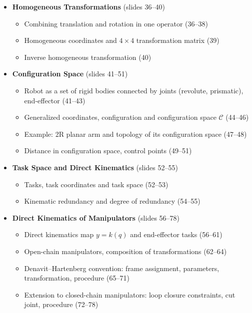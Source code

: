 \begin{itemize}
    \item \textbf{Homogeneous Transformations} (slides 36--40)
    \begin{itemize}
        \item Combining translation and rotation in one operator (36--38)
        \item Homogeneous coordinates and $4\times4$ transformation matrix (39)
        \item Inverse homogeneous transformation (40)
    \end{itemize}

    \item \textbf{Configuration Space} (slides 41--51)
    \begin{itemize}
        \item Robot as a set of rigid bodies connected by joints (revolute, prismatic), end-effector (41--43)
        \item Generalized coordinates, configuration and configuration space $\mathcal{C}$ (44--46)
        \item Example: 2R planar arm and topology of its configuration space (47--48)
        \item Distance in configuration space, control points (49--51)
    \end{itemize}

    \item \textbf{Task Space and Direct Kinematics} (slides 52--55)
    \begin{itemize}
        \item Tasks, task coordinates and task space (52--53)
        \item Kinematic redundancy and degree of redundancy (54--55)
    \end{itemize}

    \item \textbf{Direct Kinematics of Manipulators} (slides 56--78)
    \begin{itemize}
        \item Direct kinematics map $y = k(q)$ and end-effector tasks (56--61)
        \item Open-chain manipulators, composition of transformations (62--64)
        \item Denavit--Hartenberg convention: frame assignment, parameters, transformation, procedure (65--71)
        \item Extension to closed-chain manipulators: loop closure constraints, cut joint, procedure (72--78)
    \end{itemize}


\end{itemize}
